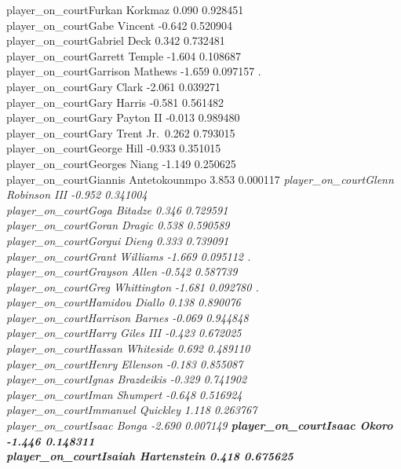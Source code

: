 \documentclass[
  landscape]{article}
\begin{document}
{{player\_on\_courtFurkan Korkmaz 0.090 0.928451\\
player\_on\_courtGabe Vincent -0.642 0.520904\\
player\_on\_courtGabriel Deck 0.342 0.732481\\
player\_on\_courtGarrett Temple -1.604 0.108687\\
player\_on\_courtGarrison Mathews -1.659 0.097157 .\\
player\_on\_courtGary Clark -2.061 0.039271 }\\
player\_on\_courtGary Harris -0.581 0.561482\\
player\_on\_courtGary Payton II -0.013 0.989480\\
player\_on\_courtGary Trent Jr.~0.262 0.793015\\
player\_on\_courtGeorge Hill -0.933 0.351015\\
player\_on\_courtGeorges Niang -1.149 0.250625\\
player\_on\_courtGiannis Antetokounmpo 3.853 0.000117 }\emph{
player\_on\_courtGlenn Robinson III -0.952 0.341004\\
player\_on\_courtGoga Bitadze 0.346 0.729591\\
player\_on\_courtGoran Dragic 0.538 0.590589\\
player\_on\_courtGorgui Dieng 0.333 0.739091\\
player\_on\_courtGrant Williams -1.669 0.095112 .\\
player\_on\_courtGrayson Allen -0.542 0.587739\\
player\_on\_courtGreg Whittington -1.681 0.092780 .\\
player\_on\_courtHamidou Diallo 0.138 0.890076\\
player\_on\_courtHarrison Barnes -0.069 0.944848\\
player\_on\_courtHarry Giles III -0.423 0.672025\\
player\_on\_courtHassan Whiteside 0.692 0.489110\\
player\_on\_courtHenry Ellenson -0.183 0.855087\\
player\_on\_courtIgnas Brazdeikis -0.329 0.741902\\
player\_on\_courtIman Shumpert -0.648 0.516924\\
player\_on\_courtImmanuel Quickley 1.118 0.263767\\
player\_on\_courtIsaac Bonga -2.690 0.007149 \textbf{
player\_on\_courtIsaac Okoro -1.446 0.148311\\
player\_on\_courtIsaiah Hartenstein 0.418 0.675625\\
}}
\end{document}
